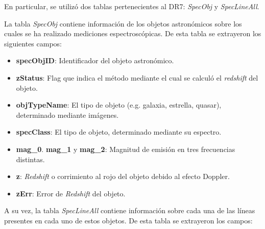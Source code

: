 En particular, se utilizó dos tablas pertenecientes al DR7: \textit{SpecObj} y \textit{SpecLineAll}. 

La tabla \textit{SpecObj} contiene información de los objetos astronómicos sobre los cuales se ha realizado mediciones espectroscópicas. De esta tabla se extrayeron los siguientes campos:

\begin{itemize}
\item \textbf{specObjID}: Identificador del objeto astronómico.
\item \textbf{zStatus}: Flag que indica el método mediante el cual se calculó el \textit{redshift} del objeto.
\item \textbf{objTypeName}: El tipo de objeto (e.g. galaxia, estrella, quasar), determinado mediante imágenes.
\item \textbf{specClass}: El tipo de objeto, determinado mediante su espectro.
\item \textbf{mag\_0}. \textbf{mag\_1} y \textbf{mag\_2}: Magnitud de emisión en tres frecuencias distintas.
\item \textbf{z}: \textit{Redshift} o corrimiento al rojo del objeto debido al efecto Doppler.
\item \textbf{zErr}: Error de \textit{Redshift} del objeto.
\end{itemize}

A su vez, la tabla \textit{SpecLineAll} contiene información sobre cada una de las líneas presentes en cada uno de estos objetos. De esta tabla se extrayeron los campos:

